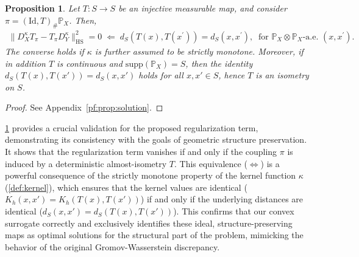 \documentclass{article}
\newtheorem{proposition}{Proposition}
\begin{document}
\begin{proposition}
	\label{prop:solution}
	Let $T: S \to S$ be an injective measurable map, and consider $\pi = (\mathrm{Id},T)_{\#}\mathbb{P}_X$. Then,
	\begin{align*}
		\|D_X^{\kappa}T_{\pi} - T_{\pi}D_Y^{\kappa}\|_{\mathrm{HS}}^2 = 0 \;\Longleftarrow\;d_S(T(x),T(x^\prime)) = d_S(x,x^\prime) ,\;\; \text{for $\mathbb{P}_X \otimes \mathbb{P}_X$-a.e. $(x,x^\prime)$} .
	\end{align*}
	The converse holds if $\kappa$ is further assumed to be strictly monotone. Moreover, if in addition $T$ is continuous and $\mathrm{supp}(\mathbb{P}_X) = S$, then the identity $d_S(T(x),T(x'))=d_S(x,x')$ holds for all $x,x'\in S$, hence $T$ is an isometry on $S$.
\end{proposition}
\begin{proof}
	See Appendix~\ref{pf:prop:solution}.
\end{proof}
\cref{prop:solution} provides a crucial validation for the proposed regularization term, demonstrating its consistency with the goals of geometric structure preservation. It shows that the regularization term vanishes if and only if the coupling $\pi$ is induced by a deterministic almost-isometry $T$. This equivalence ($\iff$) is a powerful consequence of the strictly monotone property of the kernel function $\kappa$ (\cref{def:kernel}), which ensures that the kernel values are identical ($K_h(x,x') = K_h(T(x),T(x'))$) if and only if the underlying distances are identical ($d_S(x,x') = d_S(T(x),T(x'))$). This confirms that our convex surrogate correctly and exclusively identifies these ideal, structure-preserving maps as optimal solutions for the structural part of the problem, mimicking the behavior of the original Gromov-Wasserstein discrepancy.
\end{document}
